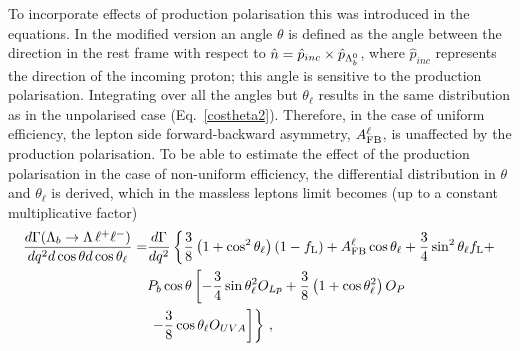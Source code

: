 To incorporate effects of production polarisation this was introduced in the equations.
%
In the modified version an angle $\theta$ is defined as the angle between the \Lz direction
in the \Lb rest frame with respect to $\hat{n} = \hat{p}_{inc} \times \hat{p}_{\Lambda^0_b}$, where $\hat{p}_{inc}$
represents the direction of the incoming proton; this angle is sensitive to the production polarisation.
Integrating over all the angles but $\theta_\ell$ results in 
the same distribution as in the unpolarised case (Eq.~\ref{costheta2}). Therefore, in the case of uniform
efficiency, the lepton side forward-backward asymmetry, $A_{\rm FB}^\ell$, is unaffected by the production
polarisation. To be able to estimate the effect of the production polarisation in the case of non-uniform efficiency, 
the differential distribution in $\theta$ and $\theta_\ell$ is derived, which in the massless leptons
limit becomes (up to a  constant multiplicative factor)
%
\begin{align}
\frac{d\Gamma(\Lambda_{b}\rightarrow \Lambda \,\ell^{+}\ell^{-})}{dq^2d\cos\theta d\cos\theta_\ell}=&
\frac{d\Gamma}{dq^2}\left\{  \frac{3}{8}\left(1+\cos^2\theta_\ell\right)(1-f_{\rm L})+A_{\rm FB}^\ell\cos\theta_\ell +
   \frac{3}{4}\sin^2\theta_\ell f_{\rm L}+\right. \nonumber \\
&P_b\cos\theta\left[ -\frac{3}{4}\sin\theta_\ell^2O_{Lp}+
  \frac{3}{8}\left(1+\cos\theta_\ell^2\right)O_P\right. \nonumber \\
&\left.\left.-\frac{3}{8}\cos\theta_\ell O_{UVA} \right]\right\}\,,
\label{eq:lepton2D}
\end{align}
